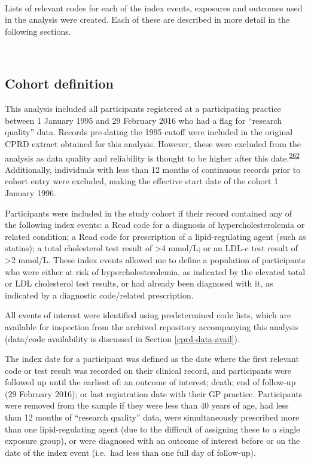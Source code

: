 \documentclass[a4paper, twoside]{templates/ociamthesis}
\begin{document}
~

Lists of relevant codes for each of the index events, exposures and outcomes used in the analysis were created. Each of these are described in more detail in the following sections.

~

\hypertarget{cohort-definition}{%
\subsection{Cohort definition}\label{cohort-definition}}

This analysis included all participants registered at a participating practice between 1 January 1995 and 29 February 2016 who had a flag for ``research quality'' data. Records pre-dating the 1995 cutoff were included in the original CPRD extract obtained for this analysis. However, these were excluded from the analysis as data quality and reliability is thought to be higher after this date.\textsuperscript{\protect\hyperlink{ref-wolf2019}{262}} Additionally, individuals with less than 12 months of continuous records prior to cohort entry were excluded, making the effective start date of the cohort 1 January 1996.

Participants were included in the study cohort if their record contained any of the following index events: a Read code for a diagnosis of hypercholesterolemia or related condition; a Read code for prescription of a lipid-regulating agent (such as statins); a total cholesterol test result of \textgreater4 mmol/L; or an LDL-c test result of \textgreater2 mmol/L. These index events allowed me to define a population of participants who were either at risk of hypercholesterolemia, as indicated by the elevated total or LDL cholesterol test results, or had already been diagnosed with it, as indicated by a diagnostic code/related prescription.

All events of interest were identified using predetermined code lists, which are available for inspection from the archived repository accompanying this analysis (data/code availability is discussed in Section \ref{cprd-data-avail}).

The index date for a participant was defined as the date where the first relevant code or test result was recorded on their clinical record, and participants were followed up until the earliest of: an outcome of interest; death; end of follow-up (29 February 2016); or last registration date with their GP practice. Participants were removed from the sample if they were less than 40 years of age, had less than 12 months of ``research quality'' data, were simultaneously prescribed more than one lipid-regulating agent (due to the difficult of assigning these to a single exposure group), or were diagnosed with an outcome of interest before or on the date of the index event (i.e.~had less than one full day of follow-up).
\end{document}
